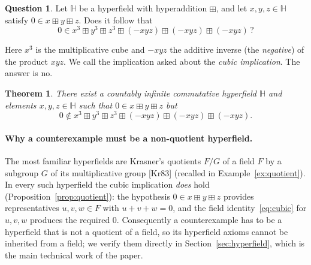 \documentclass[11pt]{article}
\theoremstyle{plain}
\newtheorem{theorem}{Theorem}[section]
\theoremstyle{definition}
\newtheorem*{question}{Question}
\newcommand{\Hh}{\mathbb{H}}
\newcommand{\bp}{\boxplus}
\begin{document}
\begin{question}
Let $\Hh$ be a hyperfield with hyperaddition $\bp$, and let
$x,y,z\in\Hh$ satisfy $0\in x\bp y\bp z$.  Does it follow that
\[
 0\in x^3\bp y^3\bp z^3\bp(-xyz)\bp(-xyz)\bp(-xyz)\,?
\]
\end{question}

\noindent
Here $x^3$ is the multiplicative cube and $-xyz$ the additive inverse
(the \emph{negative}) of the product $xyz$.  We call the implication
asked about the \emph{cubic implication}.  The answer is no.

\begin{theorem}\label{thm:main}
There exist a countably infinite commutative hyperfield $\Hh$ and
elements $x,y,z\in\Hh$ such that $0\in x\bp y\bp z$ but
\[
 0\notin x^3\bp y^3\bp z^3\bp(-xyz)\bp(-xyz)\bp(-xyz).
\]
\end{theorem}

\paragraph{Why a counterexample must be a non-quotient hyperfield.}
The most familiar hyperfields are Krasner's quotients $F/G$ of a field
$F$ by a subgroup $G$ of its multiplicative group
[Kr83] (recalled in Example~\ref{ex:quotient}).  In every such hyperfield the cubic
implication \emph{does} hold (Proposition~\ref{prop:quotient}): the
hypothesis $0\in x\bp y\bp z$ provides representatives $u,v,w\in F$
with $u+v+w=0$, and the field identity~\eqref{eq:cubic} for $u,v,w$
produces the required $0$.  Consequently a counterexample has to be a
hyperfield that is not a quotient of a field, so its hyperfield axioms
cannot be inherited from a field; we verify them directly in
Section~\ref{sec:hyperfield}, which is the main technical work of the
paper.
\end{document}
